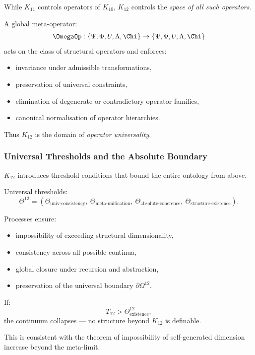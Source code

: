 While $K_{11}$ controls operators of $K_{10}$,
$K_{12}$ controls the \emph{space of all such operators}.

A global meta-operator:
\[
\OmegaOp : \{\Psi, \Phi, U, \Lambda, \Chi\} \to 
            \{\Psi, \Phi, U, \Lambda, \Chi\}
\]
acts on the class of structural operators and enforces:
\begin{itemize}
    \item invariance under admissible transformations,
    \item preservation of universal constraints,
    \item elimination of degenerate or contradictory operator families,
    \item canonical normalisation of operator hierarchies.
\end{itemize}

Thus $K_{12}$ is the domain of \emph{operator universality}.

\subsubsection{Universal Thresholds and the Absolute Boundary}

$K_{12}$ introduces threshold conditions that bound 
the entire ontology from above.

Universal thresholds:
\[
\Theta^{12} = 
(\Theta_{\text{univ-consistency}},\
 \Theta_{\text{meta-unification}},\
 \Theta_{\text{absolute-coherence}},\
 \Theta_{\text{structure-existence}}).
\]

Processes ensure:
\begin{itemize}
    \item impossibility of exceeding structural dimensionality,
    \item consistency across all possible continua,
    \item global closure under recursion and abstraction,
    \item preservation of the universal boundary $\partial\Omega^{12}$.
\end{itemize}

If:
\[
T_{12} > \Theta^{12}_{\text{existence}},
\]
the continuum collapses — no structure beyond $K_{12}$ is definable.

This is consistent with the theorem of impossibility of 
self-generated dimension increase beyond the meta-limit.

